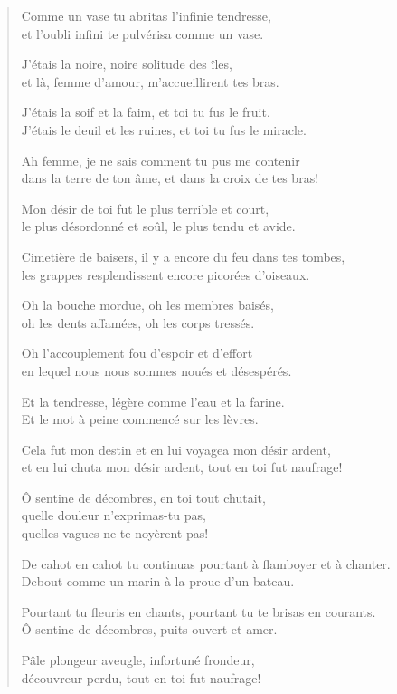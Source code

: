 \documentclass[11pt,a4paper]{book}
\begin{document}
\begin{verse}
  Comme un vase tu abritas l'infinie tendresse, \\
  et l'oubli infini te pulvérisa comme un vase.

  J'étais la noire, noire solitude des îles, \\
  et là, femme d'amour, m'accueillirent tes bras.

  J'étais la soif et la faim, et toi tu fus le fruit. \\
  J'étais le deuil et les ruines, et toi tu fus le miracle.

  Ah femme, je ne sais comment tu pus me contenir \\
  dans la terre de ton âme, et dans la croix de tes bras!

  Mon désir de toi fut le plus terrible et court, \\
  le plus désordonné et soûl, le plus tendu et avide.

  \newpage

  Cimetière de baisers, il y a encore du feu dans tes tombes, \\
  les grappes resplendissent encore picorées d'oiseaux.

  Oh la bouche mordue, oh les membres baisés, \\
  oh les dents affamées, oh les corps tressés.

  Oh l'accouplement fou d'espoir et d'effort \\
  en lequel nous nous sommes noués et désespérés.

  Et la tendresse, légère comme l'eau et la farine. \\
  Et le mot à peine commencé sur les lèvres.

  Cela fut mon destin et en lui voyagea mon désir ardent, \\
  et en lui chuta mon désir ardent, tout en toi fut naufrage!

  Ô sentine de décombres, en toi tout chutait, \\
  quelle douleur n'exprimas-tu pas, \\
  quelles vagues ne te noyèrent pas!

  De cahot en cahot tu continuas pourtant à flamboyer et à chanter. \\
  Debout comme un marin à la proue d'un bateau.

  Pourtant tu fleuris en chants, pourtant tu te brisas en courants. \\
  Ô sentine de décombres, puits ouvert et amer.

  Pâle plongeur aveugle, infortuné frondeur, \\
  découvreur perdu, tout en toi fut naufrage!


\end{verse}
\end{document}
